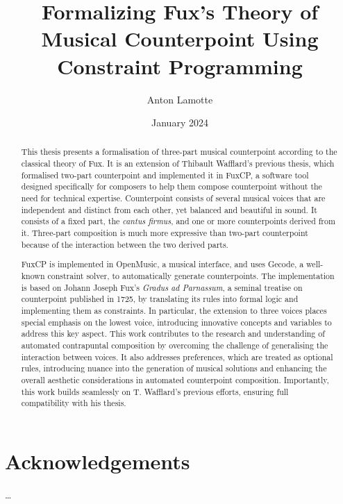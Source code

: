 \documentclass[11pt,table,xcdraw]{report}
\title{Formalizing Fux's Theory of Musical Counterpoint Using Constraint Programming}
\author{Anton Lamotte}
\date{January 2024}
\newcommand{\gap}{\textit{Gradus ad Parnassum}}
\newcommand{\cf}{\textit{cantus firmus}}
\begin{document}

\null
\thispagestyle{empty}
\addtocounter{page}{-1}
\newpage
{}
\begin{abstract}
    \large{
        This thesis presents a formalisation of three-part musical counterpoint according to the classical theory of Fux. It is an extension of Thibault Wafflard's previous thesis, which formalised two-part counterpoint and implemented it in FuxCP, a software tool designed specifically for composers to help them compose counterpoint without the need for technical expertise. Counterpoint consists of several musical voices that are independent and distinct from each other, yet balanced and beautiful in sound. It consists of a fixed part, the \cf, and one or more counterpoints derived from it. Three-part composition is much more expressive than two-part counterpoint because of the interaction between the two derived parts.

        FuxCP is implemented in OpenMusic, a musical interface, and uses Gecode, a well-known constraint solver, to automatically generate counterpoints. The implementation is based on Johann Joseph Fux's \gap, a seminal treatise on counterpoint published in 1725, by translating its rules into formal logic and implementing them as constraints. In particular, the extension to three voices places special emphasis on the lowest voice, introducing innovative concepts and variables to address this key aspect.
        This work contributes to the research and understanding of automated contrapuntal composition by overcoming the challenge of generalising the interaction between voices. It also addresses preferences, which are treated as optional rules, introducing nuance into the generation of musical solutions and enhancing the overall aesthetic considerations in automated counterpoint composition. Importantly, this work builds seamlessly on T. Wafflard's previous efforts, ensuring full compatibility with his thesis.   }
\end{abstract}

\chapter*{Acknowledgements}
\dots
\restoregeometry 
\end{document}
